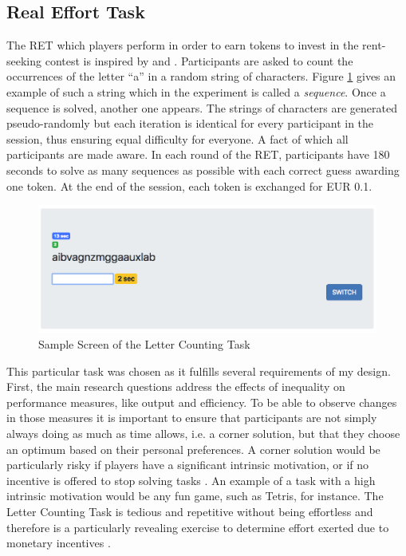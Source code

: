     
    \subsection{Real Effort Task}
    \label{sec:RET}
    
    The RET which players perform in order to earn tokens to invest in the rent-seeking contest is inspired by \cite{rey-biel2016} and \cite{giusti2014}. Participants are asked to count the occurrences of the letter ``a'' in a random string of characters. Figure \ref{fig:LC_screen} gives an example of such a string which in the experiment is called a \textit{sequence}. Once a sequence is solved, another one appears. The strings of characters are generated pseudo-randomly but each iteration is identical for every participant in the session, thus ensuring equal difficulty for everyone. A fact of which all participants are made aware. In each round of the RET, participants have 180 seconds to solve as many sequences as possible with each correct guess awarding one token. At the end of the session, each token is exchanged for EUR 0.1.\\ 
    
    \begin{figure}[h]
        \centering
        \includegraphics[width=\textwidth]{graphs/screenshot_RET_alone.png}
        \caption{Sample Screen of the Letter Counting Task}
        \label{fig:LC_screen}
    \end{figure}
    
    This particular task was chosen as it fulfills several requirements of my design. First, the main research questions address the effects of inequality on performance measures, like output and efficiency. To be able to observe changes in those measures it is important to ensure that participants are not simply always doing as much as time allows, i.e. a corner solution, but that they choose an optimum based on their personal preferences. A corner solution would be particularly risky if players have a significant intrinsic motivation, or if no incentive is offered to stop solving tasks \citep{frey1997}. An example of a task with a high intrinsic motivation would be any fun game, such as Tetris, for instance.
    The Letter Counting Task is tedious and repetitive without being effortless and therefore is a particularly revealing exercise to determine effort exerted due to monetary incentives \citep{cerasoli2014}.\\
    
